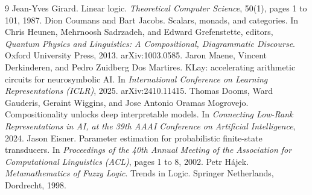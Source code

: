 \bibheading
\begin{thebibliography}{9}
 Jean-Yves Girard. Linear logic. \textit{Theoretical Computer Science}, 50(1), pages 1 to 101, 1987.
 Dion Coumans and Bart Jacobs. Scalars, monads, and categories. In Chris Heunen, Mehrnoosh Sadrzadeh, and Edward Grefenstette, editors, \textit{Quantum Physics and Linguistics: A Compositional, Diagrammatic Discourse}. Oxford University Press, 2013. arXiv:1003.0585.
 Jaron Maene, Vincent Derkinderen, and Pedro Zuidberg Dos Martires. KLay: accelerating arithmetic circuits for neurosymbolic AI. In \textit{International Conference on Learning Representations (ICLR)}, 2025. arXiv:2410.11415.
 Thomas Dooms, Ward Gauderis, Geraint Wiggins, and Jose Antonio Oramas Mogrovejo. Compositionality unlocks deep interpretable models. In \textit{Connecting Low-Rank Representations in AI, at the 39th AAAI Conference on Artificial Intelligence}, 2024.
 Jason Eisner. Parameter estimation for probabilistic finite-state transducers. In \textit{Proceedings of the 40th Annual Meeting of the Association for Computational Linguistics (ACL)}, pages 1 to 8, 2002.
 Petr Hájek. \textit{Metamathematics of Fuzzy Logic}. Trends in Logic. Springer Netherlands, Dordrecht, 1998.
\end{thebibliography}
